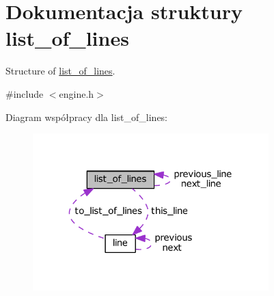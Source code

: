 \hypertarget{structlist__of__lines}{\section{Dokumentacja struktury list\-\_\-of\-\_\-lines}
\label{structlist__of__lines}
}


Structure of \hyperlink{structlist__of__lines}{list\-\_\-of\-\_\-lines}.  




{\ttfamily \#include $<$engine.\-h$>$}



Diagram współpracy dla list\-\_\-of\-\_\-lines\-:\nopagebreak
\begin{figure}[H]
\begin{center}
\leavevmode
\includegraphics[width=259pt]{structlist__of__lines__coll__graph}
\end{center}
\end{figure}
